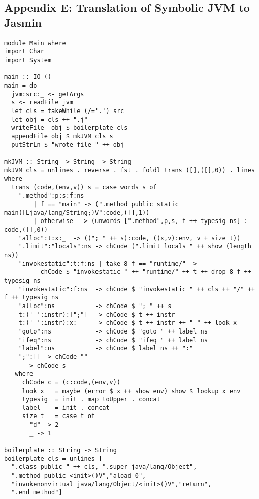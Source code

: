\documentclass[12pt]{article}
\begin{document}
\subsection*{Appendix E: Translation of Symbolic JVM to Jasmin}

\small
\begin{verbatim}
module Main where
import Char
import System

main :: IO ()
main = do
  jvm:src:_ <- getArgs
  s <- readFile jvm
  let cls = takeWhile (/='.') src
  let obj = cls ++ ".j"
  writeFile  obj $ boilerplate cls
  appendFile obj $ mkJVM cls s
  putStrLn $ "wrote file " ++ obj

mkJVM :: String -> String -> String
mkJVM cls = unlines . reverse . fst . foldl trans ([],([],0)) . lines where
  trans (code,(env,v)) s = case words s of
    ".method":p:s:f:ns
        | f == "main" -> (".method public static main([Ljava/lang/String;)V":code,([],1))
        | otherwise  -> (unwords [".method",p,s, f ++ typesig ns] : code,([],0))
    "alloc":t:x:_  -> (("; " ++ s):code, ((x,v):env, v + size t))
    ".limit":"locals":ns -> chCode (".limit locals " ++ show (length ns))
    "invokestatic":t:f:ns | take 8 f == "runtime/" -> 
          chCode $ "invokestatic " ++ "runtime/" ++ t ++ drop 8 f ++ typesig ns 
    "invokestatic":f:ns  -> chCode $ "invokestatic " ++ cls ++ "/" ++ f ++ typesig ns 
    "alloc":ns           -> chCode $ "; " ++ s
    t:('_':instr):[";"]  -> chCode $ t ++ instr
    t:('_':instr):x:_    -> chCode $ t ++ instr ++ " " ++ look x
    "goto":ns            -> chCode $ "goto " ++ label ns
    "ifeq":ns            -> chCode $ "ifeq " ++ label ns
    "label":ns           -> chCode $ label ns ++ ":"
    ";":[] -> chCode ""
    _ -> chCode s
   where
     chCode c = (c:code,(env,v))
     look x   = maybe (error $ x ++ show env) show $ lookup x env
     typesig  = init . map toUpper . concat
     label    = init . concat
     size t   = case t of
       "d" -> 2
       _ -> 1

boilerplate :: String -> String
boilerplate cls = unlines [
  ".class public " ++ cls, ".super java/lang/Object",
  ".method public <init>()V","aload_0",
  "invokenonvirtual java/lang/Object/<init>()V","return",
  ".end method"]
\end{verbatim}
\normalsize
\newpage
\end{document}
